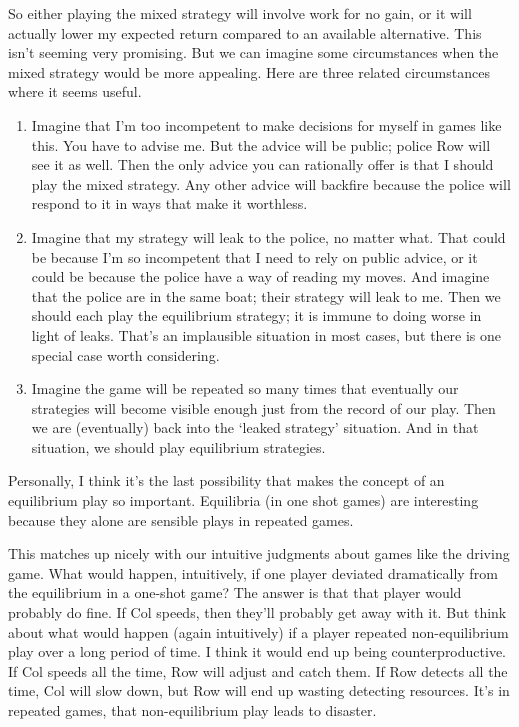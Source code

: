 \documentclass[
  11pt,
  letterpaper,
]{scrbook}
\providecommand{\tightlist}{%
  \setlength{\itemsep}{0pt}\setlength{\parskip}{0pt}}
\begin{document}
So either playing the mixed strategy will involve work for no gain, or
it will actually lower my expected return compared to an available
alternative. This isn't seeming very promising. But we can imagine some
circumstances when the mixed strategy would be more appealing. Here are
three related circumstances where it seems useful.

\begin{enumerate}
\def\labelenumi{\arabic{enumi}.}
\tightlist
\item
  Imagine that I'm too incompetent to make decisions for myself in games
  like this. You have to advise me. But the advice will be public;
  police Row will see it as well. Then the only advice you can
  rationally offer is that I should play the mixed strategy. Any other
  advice will backfire because the police will respond to it in ways
  that make it worthless.
\item
  Imagine that my strategy will leak to the police, no matter what. That
  could be because I'm so incompetent that I need to rely on public
  advice, or it could be because the police have a way of reading my
  moves. And imagine that the police are in the same boat; their
  strategy will leak to me. Then we should each play the equilibrium
  strategy; it is immune to doing worse in light of leaks. That's an
  implausible situation in most cases, but there is one special case
  worth considering.
\item
  Imagine the game will be repeated so many times that eventually our
  strategies will become visible enough just from the record of our
  play. Then we are (eventually) back into the `leaked strategy'
  situation. And in that situation, we should play equilibrium
  strategies.
\end{enumerate}

Personally, I think it's the last possibility that makes the concept of
an equilibrium play so important. Equilibria (in one shot games) are
interesting because they alone are sensible plays in repeated games.

This matches up nicely with our intuitive judgments about games like the
driving game. What would happen, intuitively, if one player deviated
dramatically from the equilibrium in a one-shot game? The answer is that
that player would probably do fine. If Col speeds, then they'll probably
get away with it. But think about what would happen (again intuitively)
if a player repeated non-equilibrium play over a long period of time. I
think it would end up being counterproductive. If Col speeds all the
time, Row will adjust and catch them. If Row detects all the time, Col
will slow down, but Row will end up wasting detecting resources. It's in
repeated games, that non-equilibrium play leads to disaster.
\end{document}
